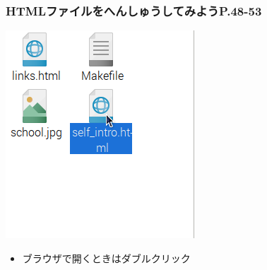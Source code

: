 \documentclass[dvipdfmx]{beamer}
\begin{document}
\begin{frame}[fragile]
	\frametitle{HTMLファイルをへんしゅうしてみようP.48-53~~~}
    \begin{minipage}[b]{0.47\textwidth}
      \includegraphics[width=\textwidth]{slide04_013.png}
      \begin{itemize}
        \item ブラウザで開くときはダブルクリック
      \end{itemize}
      \medskip
    \end{minipage}  
    \hfill    
    \begin{minipage}[b]{0.47\textwidth}

\end{minipage}
\end{frame}
\end{document}
